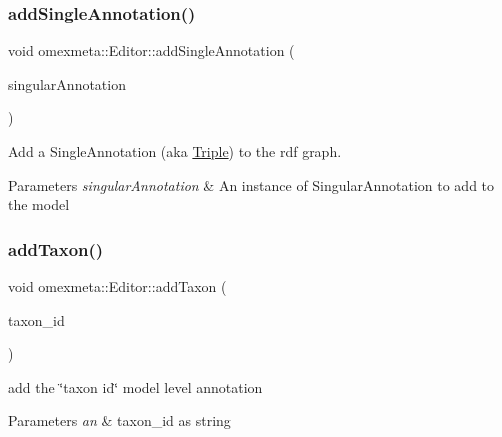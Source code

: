 \subsubsection{\texorpdfstring{add\+Single\+Annotation()}{addSingleAnnotation()}\hspace{0.1cm}{\footnotesize\ttfamily [2/2]}}
{\footnotesize\ttfamily void omexmeta\+::\+Editor\+::add\+Single\+Annotation (\begin{DoxyParamCaption}\item[{\hyperlink{classomexmeta_1_1Triple}{Singular\+Annotation} \&}]{singular\+Annotation }\end{DoxyParamCaption})}



Add a Single\+Annotation (aka \hyperlink{classomexmeta_1_1Triple}{Triple}) to the rdf graph. 


\begin{DoxyParams}{Parameters}
{\em singular\+Annotation} & An instance of Singular\+Annotation to add to the model \\
\hline
\end{DoxyParams}
\mbox{\label{classomexmeta_1_1Editor_af64f0cac6b7e27b121df94ab5b1fa217}} 
\subsubsection{\texorpdfstring{add\+Taxon()}{addTaxon()}}
{\footnotesize\ttfamily void omexmeta\+::\+Editor\+::add\+Taxon (\begin{DoxyParamCaption}\item[{const std\+::string \&}]{taxon\+\_\+id }\end{DoxyParamCaption})}



add the \char`\"{}taxon id\char`\"{} model level annotation 


\begin{DoxyParams}{Parameters}
{\em an} & taxon\+\_\+id as string \\
\hline
\end{DoxyParams}
\mbox{\label{classomexmeta_1_1Editor_af987e450e4bf9d75391ad3f5ac6233f6}} 
